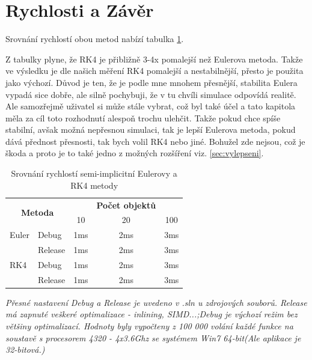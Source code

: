 \section{Rychlosti a Závěr}
Srovnání rychlostí obou metod nabízí tabulka \ref{tab:rychlost}. 

Z tabulky plyne, že RK4 je přibližně 3-4x pomalejší než Eulerova metoda. Takže ve výsledku je dle našich měření RK4 pomalejší a nestabilnější, přesto je použita jako výchozí. Důvod je ten, že je podle mne mnohem přesnější, stabilita Eulera vypadá sice dobře, ale silně pochybuji, že v tu chvíli simulace odpovídá realitě. Ale samozřejmě uživatel si může stále vybrat, což byl také účel a tato kapitola měla za cíl toto rozhodnutí alespoň trochu ulehčit. Takže pokud chce spíše stabilní, avšak možná nepřesnou simulaci, tak je lepší Eulerova metoda, pokud dává přednost přesnosti, tak bych volil RK4 nebo jiné. Bohužel  zde nejsou, což je škoda a proto je to také jedno z možných rozšíření viz. \ref{sec:vylepseni}.
\begin{table}
	\centering
	\label{tab:rychlost}
	\caption{Srovnání rychlostí semi-implicitní Eulerovy a RK4 metody}
	\begin{tabular}{l l c c c}
		\hline\multicolumn{2}{c}{\multirow{2}{*}{\textbf{Metoda}}}& & \textbf{Počet objektů}\\ 
		&& 10 & 20 & 100\\
		\hline
		Euler&Debug&1ms&2ms&3ms\\
			 &Release&1ms&2ms&3ms\\\hline
		RK4&Debug&1ms&2ms&3ms\\
		&Release&1ms&2ms&3ms\\\hline
	\end{tabular}
	\newline
	\flushleft
	\textit{Přesné nastavení Debug a Release je uvedeno v .sln u zdrojových souborů. Release má zapnuté veškeré optimalizace - inlining, SIMD...;Debug je výchozí režim bez většiny optimalizací. Hodnoty byly vypočteny z 100 000 volání každé funkce na soustavě s procesorem 4320 - 4x3.6Ghz se systémem Win7 64-bit(Ale aplikace je 32-bitová.)}
\end{table}